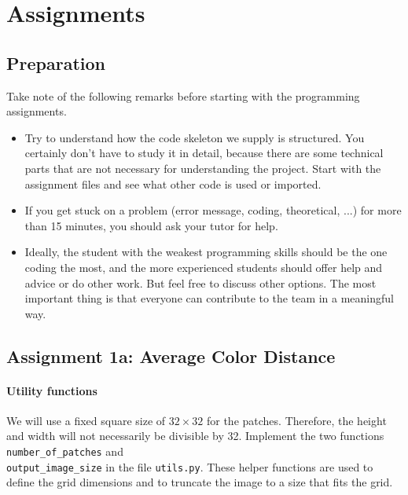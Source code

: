 \documentclass[]{article}
\begin{document}

\section{Assignments}

	\subsection{Preparation}
		Take note of the following remarks before starting with the programming assignments.
		\begin{itemize}
			\item Try to understand how the code skeleton we supply is structured.
			You certainly don't have to study it in detail, because there are some technical parts that are not necessary for understanding the project.
			Start with the assignment files and see what other code is used or imported.
			
			\item If you get stuck on a problem (error message, coding, theoretical, ...) for more than 15 minutes, you should ask your tutor for help.
			
			\item Ideally, the student with the weakest programming skills should be the one coding the most, and the more experienced students should offer help and advice or do other work. 
			But feel free to discuss other options. 
			The most important thing is that everyone can contribute to the team in a meaningful way.
		\end{itemize}

	\subsection{Assignment 1a: Average Color Distance}
		\paragraph{Utility functions} 
		We will use a fixed square size of $32 \times 32$ for the patches.
		Therefore, the height and width will not necessarily be divisible by 32.
		Implement the two functions \verb|number_of_patches| and \\ 
		\verb|output_image_size| in the file \verb|utils.py|.
		These helper functions are used to define the grid dimensions and to truncate the image to a size that fits the grid.
		
\end{document}
